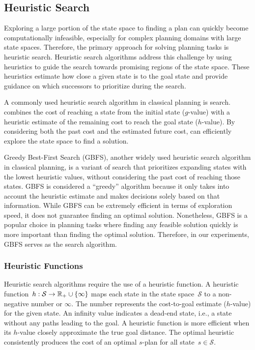 \subsection{Heuristic Search}
\label{sec:background_heuristicsearch}

Exploring a large portion of the state space to finding a plan can quickly become computationally infeasible, especially for complex planning domains with large state spaces. Therefore, the primary approach for solving planning tasks is heuristic search. Heuristic search algorithms address this challenge by using heuristics to guide the search towards promising regions of the state space. These heuristics estimate how close a given state is to the goal state and provide guidance on which successors to prioritize during the search.

A commonly used heuristic search algorithm in classical planning is \astar search. \astar combines the cost of reaching a state from the initial state ($g$-value) with a heuristic estimate of the remaining cost to reach the goal state ($h$-value). By considering both the past cost and the estimated future cost, \astar can efficiently explore the state space to find a solution.

Greedy Best-First Search (GBFS), another widely used heuristic search algorithm in classical planning, is a variant of \astar search that prioritizes expanding states with the lowest heuristic values, without considering the past cost of reaching those states. GBFS is considered a ``greedy'' algorithm because it only takes into account the heuristic estimate and makes decisions solely based on that information. While GBFS can be extremely efficient in terms of exploration speed, it does not guarantee finding an optimal solution. Nonetheless, GBFS is a popular choice in planning tasks where finding any feasible solution quickly is more important than finding the optimal solution. Therefore, in our experiments, GBFS serves as the search algorithm.

\subsubsection{Heuristic Functions}
\label{sec:background_heuristicfunctions}

Heuristic search algorithms require the use of a heuristic function. A heuristic function~$h:\mathcal{S}\rightarrow\mathbb{R}_{+}\cup\{\infty\}$ maps each state in the state space~$\mathcal{S}$ to a non-negative number or $\infty$. The number represents the cost-to-goal estimate ($h$-value) for the given state. An infinity value indicates a dead-end state, i.e., a state without any paths leading to the goal. A heuristic function is more efficient when its $h$-value closely approximate the true goal distance. The optimal heuristic \hstar consistently produces the cost of an optimal $s$-plan for all state~$s \in \mathcal{S}$.

